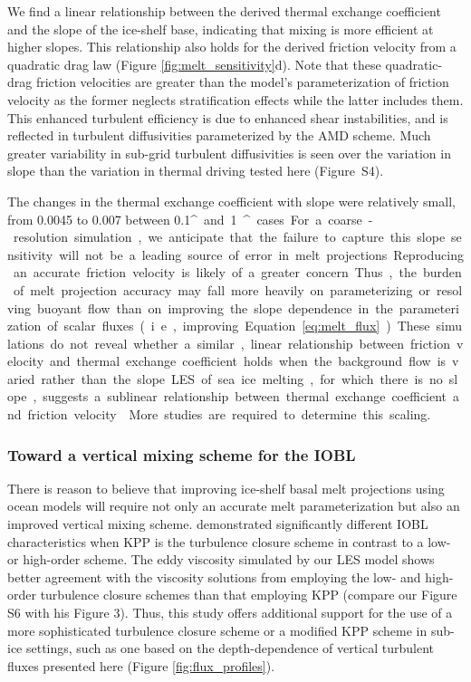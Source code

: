 \documentclass[tc, manuscript]{copernicus}
\begin{document}
We find a linear relationship between the derived thermal exchange coefficient and the slope of the ice-shelf base, indicating that mixing is more efficient at higher slopes. This relationship also holds for the derived friction velocity from a quadratic drag law (Figure \ref{fig:melt_sensitivity}d). Note that these quadratic-drag friction velocities are greater than the model's parameterization of friction velocity as the former neglects stratification effects while the latter includes them. This enhanced turbulent efficiency is due to enhanced shear instabilities, and is reflected in turbulent diffusivities parameterized by the AMD scheme. Much greater variability in sub-grid turbulent diffusivities is seen over the variation in slope than the variation in thermal driving tested here (Figure~S4). 

The changes in the thermal exchange coefficient with slope were relatively small, from 0.0045 to 0.007 between 0.1\unit{^{\circ}} and 1\unit{^{\circ}} cases. For a coarse-resolution simulation, we anticipate that the failure to capture this slope sensitivity will not be a leading source of error in melt projections. Reproducing an accurate friction velocity is likely of a greater concern. Thus, the burden of melt projection accuracy may fall more heavily on parameterizing or resolving buoyant flow than on improving the slope dependence in the parameterization of scalar fluxes (i.e., improving Equation~\ref{eq:melt_flux}). 

These simulations do not reveal whether a similar, linear relationship between friction velocity and thermal exchange coefficient holds when the background flow is varied rather than the slope. LES of sea ice melting, for which there is no slope, suggests a sublinear relationship between thermal exchange coefficient and friction velocity \citep[$\Gamma_T \propto u_*^{0.5},\:\overline{w^\prime \theta^\prime} \propto u_*^{1.5}$;][]{ramudu_large_2018}. More studies are  required to determine this scaling. 


\subsubsection{Toward a vertical mixing scheme for the IOBL}\label{disc:prm_vmix}

There is reason to believe that improving ice-shelf basal melt projections using ocean models will require not only an accurate melt parameterization but also an improved vertical mixing scheme. \citet{jenkins_shear_2021} demonstrated significantly different IOBL characteristics when KPP is the turbulence closure scheme in contrast to a low- or high-order scheme. The eddy viscosity simulated by our LES model shows better agreement with the viscosity solutions from \citet{jenkins_shear_2021} employing the low- and high-order turbulence closure schemes than that employing KPP (compare our Figure S6 with his Figure 3). Thus, this study offers additional support for the use of a more sophisticated turbulence closure scheme or a modified KPP scheme in sub-ice settings, such as one based on the depth-dependence of vertical turbulent fluxes presented here (Figure \ref{fig:flux_profiles}).
\end{document}
